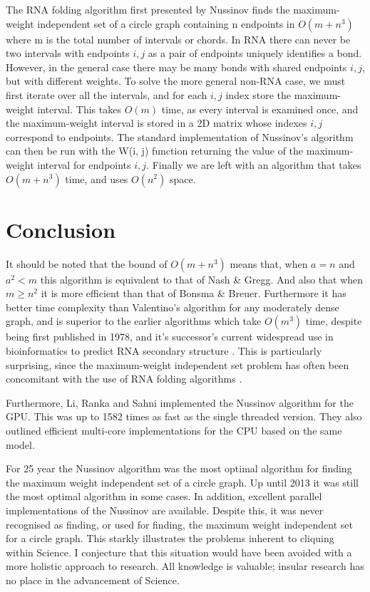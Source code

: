 \documentclass[12pt, a4paper]{article}
\begin{document}
The RNA folding algorithm first presented by Nussinov finds the maximum-weight independent set of a circle graph containing n endpoints in $O(m + n^3)$ where m is the total number of intervals or chords. In RNA there can never be two intervals with endpoints $i, j$ as a pair of endpoints uniquely identifies a bond. However, in the general case there may be many bonds with shared endpoints $i, j$, but with different weights. To solve the more general non-RNA case, we must first iterate over all the intervals, and for each $i, j$ index store the maximum-weight interval. This takes $O(m)$ time, as every interval is examined once, and the maximum-weight interval is stored in a 2D matrix whose indexes $i, j$ correspond to endpoints. The standard implementation of Nussinov’s algorithm can then be run with the W(i, j) function returning the value of the maximum-weight interval for endpoints $i, j$. Finally we are left with an algorithm that takes $O(m + n^3)$ time, and uses $O(n^2)$ space.


\section*{Conclusion}
It should be noted that the bound of $O(m + n^3)$ means that, when $a = n$ and $a^2 < m$ this algorithm is equivalent to that of Nash \& Gregg. And also that when $m \geq n^2$ it is more efficient than that of Bonsma \& Breuer. Furthermore it has better time complexity than Valentino's algorithm for any moderately dense graph, and is superior to the earlier algorithms which take $O(m^3)$ time, despite being first published in 1978, and it’s successor's current widespread use in bioinformatics to predict RNA secondary structure \cite{lorenz2011viennarna}. This is particularly surprising, since the maximum-weight independent set problem has often been concomitant with the use of RNA folding algorithms \cite{sperschneider2008knotseeker, bon2011tt2ne}.

Furthermore, Li, Ranka and Sahni \cite{li2013multicore} implemented the Nussinov algorithm for the GPU. This was up to 1582 times as fast as the single threaded version. They also outlined efficient multi-core implementations for the CPU based on the same model.

For 25 year the Nussinov algorithm was the most optimal algorithm for finding the maximum weight independent set of a circle graph. Up until 2013 it was still the most optimal algorithm in some cases. In addition, excellent parallel implementations of the Nussinov are available. Despite this, it was never recognised as finding, or used for finding, the maximum weight independent set for a circle graph. This starkly illustrates the problems inherent to cliquing within Science. I conjecture that this situation would have been avoided with a more holistic approach to research. All knowledge is valuable; insular research has no place in the advancement of Science.




\end{document}
